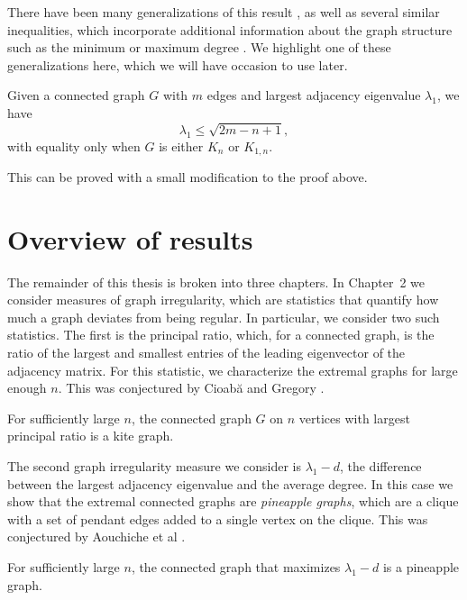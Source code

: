 There have been many generalizations of this result \cite{Friedland1988, Hong1988, HongEtAl2001, Nikiforov2002, DasKumar2004},
as well as several
similar inequalities, which incorporate additional information about the graph structure
such as the minimum or maximum degree \cite{FavaronMaheoSacle1993, BermanZhang2001, Nikiforov2006Walks}.  We highlight one of these generalizations here, which we will have occasion to use later.

\begin{theorem}
  Given a connected graph $G$ with $m$ edges and largest adjacency eigenvalue $\lambda_1$, we have
  \[ \lambda_1 \leq \sqrt{2m - n + 1} ,\]
  with equality only when $G$ is either $K_n$ or $K_{1,n}$.
\end{theorem}
\noindent This can be proved with a small modification to the proof above.  


\section{Overview of results}

The remainder of this thesis is broken into three chapters.  In Chapter~2 we consider
measures of graph irregularity, which are statistics that quantify how much a graph deviates
from being regular.
In particular, we consider two such statistics. The first is the principal ratio, which,
for a connected graph, is the ratio of the largest and smallest entries of the leading
eigenvector of the adjacency matrix.  For this statistic, we characterize the extremal
graphs for large enough $n$.  This was conjectured by Cioab\u{a} and Gregory
\cite{CioabaGregory2007}.
\begin{theorem}
  For sufficiently large $n$, the connected graph $G$ on $n$
  vertices with largest principal ratio is a kite graph.
\end{theorem}
\noindent The second graph irregularity measure we consider is  $\lambda_1 - d$,
the difference between the largest adjacency eigenvalue and the average degree.
In this case we show that the extremal connected graphs are \textit{pineapple graphs}, which
are a clique with a set of pendant edges added to a single vertex on the clique.
This was conjectured by Aouchiche et al \cite{AouchicheEtAl2008}.
\begin{theorem}
  For sufficiently large $n$, the connected graph that maximizes $\lambda_1 - d$
  is a pineapple graph.
\end{theorem}



